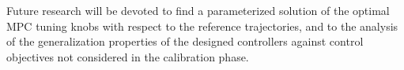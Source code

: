 \documentclass{article}
\begin{document}
Future research will be devoted to find a parameterized  solution of the optimal MPC tuning knobs with respect to the reference trajectories, and to the analysis of the  generalization properties of the designed controllers against control objectives not considered in the calibration phase.  

 

                                                   
\end{document}
